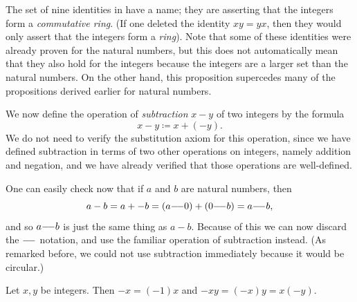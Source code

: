 \begin{rmk}\label{i:4.1.7}
  The set of nine identities in  have a name;
  they are asserting that the integers form a \emph{commutative ring}.
  (If one deleted the identity \(xy = yx\), then they would only assert that the integers form a \emph{ring}).
  Note that some of these identities were already proven for the natural numbers, but this does not automatically mean that they also hold for the integers because the integers are a larger set than the natural numbers.
  On the other hand, this proposition supercedes many of the propositions derived earlier for natural numbers.
\end{rmk}

\begin{ac}\label{i:ac:4.1.4}
  We now define the operation of \emph{subtraction} \(x - y\) of two integers by the formula
  \[
    x - y \coloneqq x + (-y).
  \]
  We do not need to verify the substitution axiom for this operation, since we have defined subtraction in terms of two other operations on integers, namely addition and negation, and we have already verified that those operations are well-defined.

  One can easily check now that if \(a\) and \(b\) are natural numbers, then
  \[
    a - b = a + -b = (a {-}\!{-} 0) + (0 {-}\!{-} b) = a {-}\!{-} b,
  \]
  and so \(a {-}\!{-} b\) is just the same thing as \(a - b\).
  Because of this we can now discard the \({-}\!{-}\) notation, and use the familiar operation of subtraction instead.
  (As remarked before, we could not use subtraction immediately because it would be circular.)
\end{ac}

\begin{ac}\label{i:ac:4.1.5}
  Let \(x, y\) be integers.
  Then \(-x = (-1) x\) and \(-xy = (-x) y = x (-y)\).
\end{ac}

